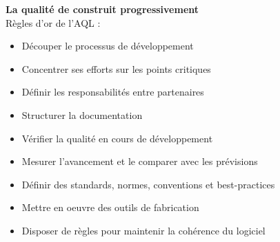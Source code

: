 \textbf{La qualité de construit progressivement}\hfill\\

Règles d’or de l’AQL :
\begin{itemize}
\item Découper le processus de développement
\item Concentrer ses efforts sur les points critiques
\item Définir les responsabilités entre partenaires
\item Structurer la documentation
\item Vérifier la qualité en cours de développement
\item Mesurer l’avancement et le comparer avec les prévisions
\item Définir des standards, normes, conventions et best-practices
\item Mettre en oeuvre des outils de fabrication
\item Disposer de règles pour maintenir la cohérence du logiciel
\end{itemize}
